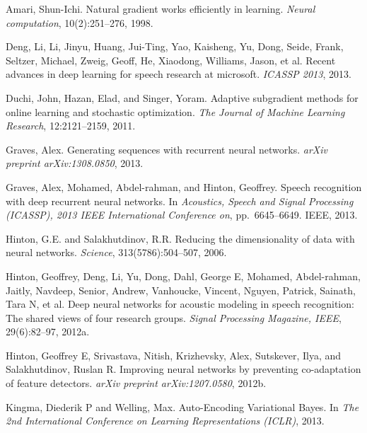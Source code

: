 \documentclass[11pt]{article}
\begin{document}
\begin{list}{}{%
  \setlength{\leftmargin}{1.5em}%
  \setlength{\itemindent}{-1.5em}%
  \setlength{\itemsep}{0.5em}%
  \setlength{\parsep}{0pt}%
}

\item Amari, Shun-Ichi. Natural gradient works efficiently in
learning. \emph{Neural computation}, 10(2):251--276, 1998.

\item Deng, Li, Li, Jinyu, Huang, Jui-Ting, Yao, Kaisheng, Yu,
Dong, Seide, Frank, Seltzer, Michael, Zweig, Geoff, He, Xiaodong,
Williams, Jason, et al. Recent advances in deep learning for
speech research at microsoft. \emph{ICASSP 2013}, 2013.

\item Duchi, John, Hazan, Elad, and Singer, Yoram. Adaptive
subgradient methods for online learning and stochastic
optimization. \emph{The Journal of Machine Learning Research},
12:2121--2159, 2011.

\item Graves, Alex. Generating sequences with recurrent neural
networks. \emph{arXiv preprint arXiv:1308.0850}, 2013.

\item Graves, Alex, Mohamed, Abdel-rahman, and Hinton, Geoffrey.
Speech recognition with deep recurrent neural networks. In
\emph{Acoustics, Speech and Signal Processing (ICASSP), 2013
IEEE International Conference on}, pp.~6645--6649. IEEE, 2013.

\item Hinton, G.E. and Salakhutdinov, R.R. Reducing the
dimensionality of data with neural networks. \emph{Science},
313(5786):504--507, 2006.

\item Hinton, Geoffrey, Deng, Li, Yu, Dong, Dahl, George E,
Mohamed, Abdel-rahman, Jaitly, Navdeep, Senior, Andrew,
Vanhoucke, Vincent, Nguyen, Patrick, Sainath, Tara N, et al.
Deep neural networks for acoustic modeling in speech
recognition: The shared views of four research groups.
\emph{Signal Processing Magazine, IEEE}, 29(6):82--97, 2012a.

\item Hinton, Geoffrey E, Srivastava, Nitish, Krizhevsky, Alex,
Sutskever, Ilya, and Salakhutdinov, Ruslan R. Improving neural
networks by preventing co-adaptation of feature detectors.
\emph{arXiv preprint arXiv:1207.0580}, 2012b.

\item Kingma, Diederik P and Welling, Max. Auto-Encoding
Variational Bayes. In \emph{The 2nd International Conference on
Learning Representations (ICLR)}, 2013.


\end{list}
\end{document}
